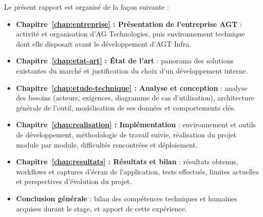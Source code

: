 Le présent rapport est organisé de la façon suivante :

\begin{itemize}
  \item \textbf{Chapitre~\ref{chap:entreprise} : Présentation de
        l'entreprise AGT} : activité et organisation d'AG Technologies,
        puis environnement technique dont elle disposait avant le
        développement d'AGT Infra.
  \item \textbf{Chapitre~\ref{chap:etat-art} : État de l'art} : panorama
        des solutions existantes du marché et justification du choix d'un
        développement interne.
  \item \textbf{Chapitre~\ref{chap:etude-technique} : Analyse et
        conception} : analyse des besoins (acteurs, exigences,
        diagramme de cas d'utilisation), architecture générale de
        l'outil, modélisation de ses données et comportements clés.
  \item \textbf{Chapitre~\ref{chap:realisation} : Implémentation} :
        environnement et outils de développement, méthodologie de
        travail suivie, réalisation du projet module par module,
        difficultés rencontrées et déploiement.
  \item \textbf{Chapitre~\ref{chap:resultats} : Résultats et bilan} :
        résultats obtenus, workflows et captures d'écran de
        l'application, tests effectués, limites actuelles et
        perspectives d'évolution du projet.
  \item \textbf{Conclusion générale} : bilan des compétences techniques
        et humaines acquises durant le stage, et apport de cette
        expérience.
\end{itemize}